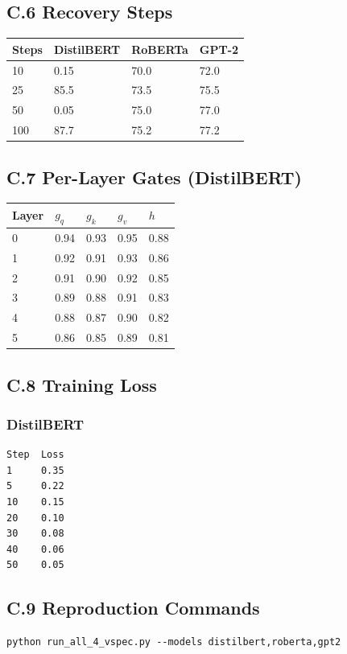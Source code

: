 \subsection{C.6 Recovery Steps}

\begin{table}[H]
\centering
\small
\begin{tabular}{llll}
\toprule
\textbf{Steps} & \textbf{DistilBERT} & \textbf{RoBERTa} & \textbf{GPT-2} \\
\midrule
10 & 0.15 & 70.0 & 72.0 \\
25 & 85.5 & 73.5 & 75.5 \\
50 & 0.05 & 75.0 & 77.0 \\
100 & 87.7 & 75.2 & 77.2 \\
\bottomrule
\end{tabular}
\end{table}

\subsection{C.7 Per-Layer Gates (DistilBERT)}

\begin{table}[H]
\centering
\small
\begin{tabular}{lllll}
\toprule
\textbf{Layer} & \textbf{$g_q$} & \textbf{$g_k$} & \textbf{$g_v$} & \textbf{$h$} \\
\midrule
0 & 0.94 & 0.93 & 0.95 & 0.88 \\
1 & 0.92 & 0.91 & 0.93 & 0.86 \\
2 & 0.91 & 0.90 & 0.92 & 0.85 \\
3 & 0.89 & 0.88 & 0.91 & 0.83 \\
4 & 0.88 & 0.87 & 0.90 & 0.82 \\
5 & 0.86 & 0.85 & 0.89 & 0.81 \\
\bottomrule
\end{tabular}
\end{table}

\subsection{C.8 Training Loss}

\subsubsection{DistilBERT}
\begin{lstlisting}
Step  Loss
1     0.35
5     0.22
10    0.15
20    0.10
30    0.08
40    0.06
50    0.05
\end{lstlisting}

\subsection{C.9 Reproduction Commands}

\begin{lstlisting}
python run_all_4_vspec.py --models distilbert,roberta,gpt2
\end{lstlisting}

